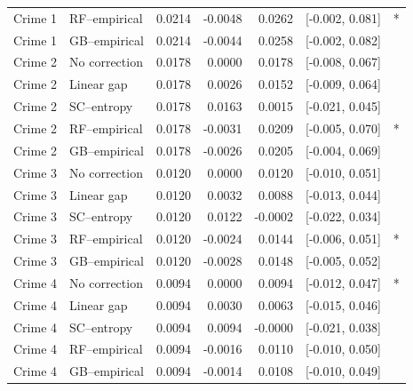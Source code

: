\begin{longtable}{llrrrrl}
Crime 1 & RF--empirical & 0.0214 & -0.0048 & 0.0262 & [-0.002, 0.081] & *\\
Crime 1 & GB--empirical & 0.0214 & -0.0044 & 0.0258 & [-0.002, 0.082] & \\
\midrule
Crime 2 & No correction & 0.0178 & 0.0000 & 0.0178 & [-0.008, 0.067] & \\
Crime 2 & Linear gap & 0.0178 & 0.0026 & 0.0152 & [-0.009, 0.064] & \\
Crime 2 & SC--entropy & 0.0178 & 0.0163 & 0.0015 & [-0.021, 0.045] & \\
Crime 2 & RF--empirical & 0.0178 & -0.0031 & 0.0209 & [-0.005, 0.070] & *\\
Crime 2 & GB--empirical & 0.0178 & -0.0026 & 0.0205 & [-0.004, 0.069] & \\
\midrule
Crime 3 & No correction & 0.0120 & 0.0000 & 0.0120 & [-0.010, 0.051] & \\
Crime 3 & Linear gap & 0.0120 & 0.0032 & 0.0088 & [-0.013, 0.044] & \\
Crime 3 & SC--entropy & 0.0120 & 0.0122 & -0.0002 & [-0.022, 0.034] & \\
Crime 3 & RF--empirical & 0.0120 & -0.0024 & 0.0144 & [-0.006, 0.051] & *\\
Crime 3 & GB--empirical & 0.0120 & -0.0028 & 0.0148 & [-0.005, 0.052] & \\
\midrule
Crime 4 & No correction & 0.0094 & 0.0000 & 0.0094 & [-0.012, 0.047] & *\\
Crime 4 & Linear gap & 0.0094 & 0.0030 & 0.0063 & [-0.015, 0.046] & \\
Crime 4 & SC--entropy & 0.0094 & 0.0094 & -0.0000 & [-0.021, 0.038] & \\
Crime 4 & RF--empirical & 0.0094 & -0.0016 & 0.0110 & [-0.010, 0.050] & \\
Crime 4 & GB--empirical & 0.0094 & -0.0014 & 0.0108 & [-0.010, 0.049] & \\
\bottomrule
\end{longtable}
